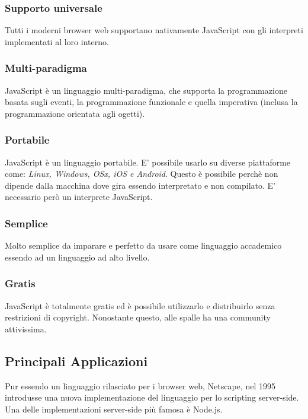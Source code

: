             \subsubsection{Supporto universale}
                Tutti i moderni browser web supportano nativamente JavaScript con gli interpreti implementati al loro interno.
            
            \subsubsection{Multi-paradigma}
                JavaScript è un linguaggio multi-paradigma, che supporta la programmazione basata sugli eventi, la programmazione funzionale e quella imperativa (inclusa la programmazione orientata agli ogetti).

            \subsubsection{Portabile}
                JavaScript è un linguaggio portabile. E' possibile usarlo su diverse piattaforme come: \textit{Linux, Windows, OSx, iOS e Android}. Questo è possibile perchè non dipende dalla macchina dove gira essendo interpretato e non compilato. E' necessario però un interprete JavaScript.

            \subsubsection{Semplice}
                Molto semplice da imparare e perfetto da usare come linguaggio accademico essendo ad un linguaggio ad alto livello.

            \subsubsection{Gratis}
                JavaScript è totalmente gratis ed è possibile utilizzarlo e distribuirlo senza restrizioni di copyright. Nonostante questo, alle spalle ha una community attivissima.

        \subsection{Principali Applicazioni}
            Pur essendo un linguaggio rilasciato per i browser web, Netscape, nel 1995 introdusse una nuova implementazione del linguaggio per lo scripting server-side. Una delle implementazioni server-side più famosa è Node.js.

